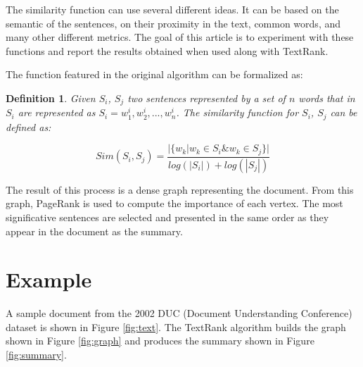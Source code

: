 \documentclass{llncs}
\newtheorem{definicion}{Definition}
\begin{document}
The similarity function can use several different ideas. It can be based on the semantic of the sentences, on their proximity in the text, common words, and many other different metrics. The goal of this article is to experiment with these functions and report the results obtained when used along with TextRank.

The function featured in the original algorithm can be formalized as:

\begin{definicion}
Given $S_i$, $S_j$ two sentences represented by a set of $n$ words that in 
$S_i$ are represented as $S_i = w_{1}^{i}, w_{2}^{i},..., w_{n}^{i}$. The similarity function for $S_i$, $S_j$ can be defined as:


\begin{equation}
Sim(S_{i},S_{j}) = \frac{ | \{   w_{k} | w_{k} \in S_{i} \& w_{k} \in S_{j}   \}  | }    
                              {  log(|S_{i}|) + log(|S_{j}|)  }
\end{equation}


\end{definicion}

The result of this process is a dense graph representing the document. From this graph, PageRank is used to compute the importance of each vertex. The most significative sentences are selected and presented in the same order as they appear in the document as the summary.

\section{Example}
A sample document from the 2002 DUC (Document Understanding Conference) dataset \cite{duc2002-guidelines} is shown in Figure \ref{fig:text}. The TextRank algorithm builds the graph shown in Figure \ref{fig:graph} and produces the summary shown in Figure \ref{fig:summary}.
\end{document}
